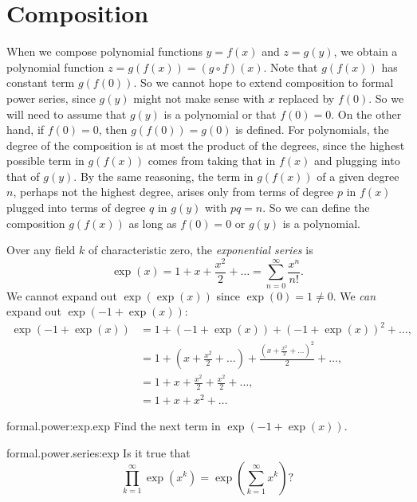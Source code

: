 \section{Composition}
When we compose polynomial functions \(y=f(x)\) and \(z=g(y)\), we obtain a polynomial function \(z=g(f(x))=(g\circ f)(x)\).
Note that \(g(f(x))\) has constant term \(g(f(0))\).
So we cannot hope to extend composition to formal power series, since \(g(y)\) might not make sense with \(x\) replaced by \(f(0)\).
So we will need to assume that \(g(y)\) is a polynomial or that \(f(0)=0\).
On the other hand, if \(f(0)=0\), then \(g(f(0))=g(0)\) is defined.
For polynomials, the degree of the composition is at most the product of the degrees, since the highest possible term in \(g(f(x))\) comes from taking that in \(f(x)\) and plugging into that of \(g(y)\).
By the same reasoning, the term in \(g(f(x))\) of a given degree \(n\), perhaps not the highest degree, arises only from terms of degree \(p\) in \(f(x)\) plugged into terms of degree \(q\) in \(g(y)\) with \(pq=n\). 
So we can define the composition \(g(f(x))\) as long as \(f(0)=0\) or \(g(y)\) is a polynomial.
\begin{example}
Over any field \(k\) of characteristic zero, the \emph{exponential series} is
\[
\exp(x)=1+x+\frac{x^2}{2}+\dots=\sum_{n=0}^{\infty} \frac{x^n}{n!}.
\]
We cannot expand out \(\exp(\exp(x))\) since \(\exp(0)=1\ne 0\).
We \emph{can} expand out \(\exp(-1+\exp(x))\):
\begin{align*}
\exp(-1+\exp(x))
&=
1+(-1+\exp(x))+(-1+\exp(x))^2+\dots,
\\
&=
1+\left(x+\frac{x^2}{2}+\dots\right)+\frac{\left(x+\frac{x^2}{2}+\dots\right)^2}{2}+\dots,
\\
&=
1+x+\frac{x^2}{2}+\frac{x^2}{2}+\dots,
\\
&=1+x+x^2+\dots
\end{align*}
\end{example}
\begin{problem}{formal.power:exp.exp}
Find the next term in \(\exp(-1+\exp(x))\).
\end{problem}
\begin{problem}{formal.power.series:exp}
Is it true that
\[
\prod_{k=1}^{\infty}\exp(x^k)
=
\exp\left(\sum_{k=1}^{\infty} x^k\right)?
\]
\end{problem}

